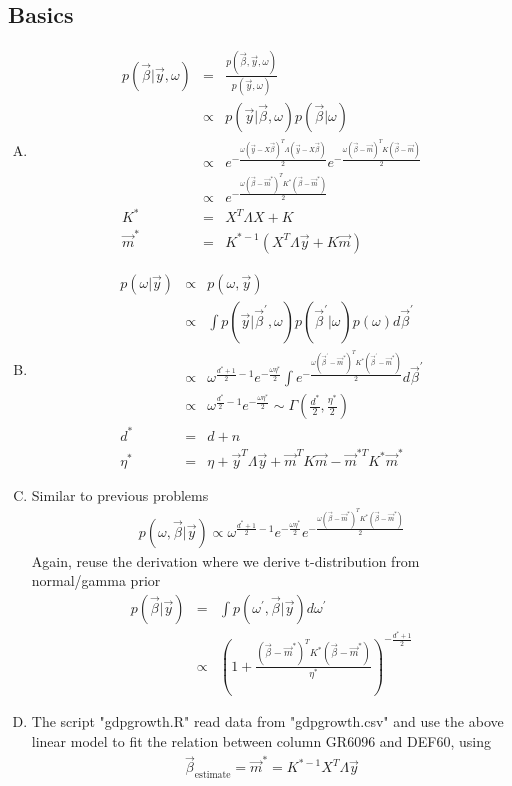 \documentclass{article}
\begin{document}
\subsection{Basics}
\begin{enumerate}[(A)]
\item
\begin{eqnarray}
p(\vec{\beta}|\vec{y},\omega)&=&\frac{p(\vec{\beta},\vec{y},\omega)}{p(\vec{y},\omega)}\nonumber\\
&\propto&p(\vec{y}|\vec{\beta},\omega)p(\vec{\beta}|\omega)\nonumber\\
&\propto&e^{-\frac{\omega(\vec{y}-X\vec{\beta})^T\Lambda(\vec{y}-X\vec{\beta})}{2}}e^{-\frac{\omega(\vec{\beta}-\vec{m})^TK(\vec{\beta}-\vec{m})}{2}}\nonumber\\
&\propto&e^{-\frac{\omega(\vec{\beta}-\vec{m}^*)^TK^*(\vec{\beta}-\vec{m}^*)}{2}}\\
K^*&=&X^T\Lambda X+K\\
\vec{m}^*&=&K^{*-1}(X^T\Lambda\vec{y}+K\vec{m})
\end{eqnarray}
\item
\begin{eqnarray}
p(\omega|\vec{y})&\propto&p(\omega,\vec{y})\nonumber\\
&\propto&\int p(\vec{y}|\vec{\beta}^\prime,\omega)p(\vec{\beta}^\prime|\omega)p(\omega)d\vec{\beta}^\prime\nonumber\\
&\propto&\omega^{\frac{d^*+1}{2}-1}e^{-\frac{\omega\eta^*}{2}}\int e^{-\frac{\omega(\vec{\beta}^\prime-\vec{m}^*)^TK^*(\vec{\beta}^\prime-\vec{m}^*)}{2}}d\vec{\beta}^\prime\nonumber\\
&\propto&\omega^{\frac{d^*}{2}-1}e^{-\frac{\omega\eta^*}{2}}\sim\Gamma(\frac{d^*}{2},\frac{\eta^*}{2})\\
d^*&=&d+n\\
\eta^*&=&\eta+\vec{y}^T\Lambda\vec{y}+\vec{m}^TK\vec{m}-\vec{m}^{*T}K^*\vec{m}^*
\end{eqnarray}
\item
Similar to previous problems
\begin{eqnarray}
p(\omega,\vec{\beta}|\vec{y})\propto\omega^{\frac{d^*+1}{2}-1}e^{-\frac{\omega\eta^*}{2}}e^{-\frac{\omega(\vec{\beta}-\vec{m}^*)^TK^*(\vec{\beta}-\vec{m}^*)}{2}}
\end{eqnarray}
Again, reuse the derivation where we derive t-distribution from normal/gamma prior
\begin{eqnarray}
p(\vec{\beta}|\vec{y})&=&\int p(\omega^\prime,\vec{\beta}|\vec{y})d\omega^\prime\nonumber\\
&\propto&(1+\frac{(\vec{\beta}-\vec{m}^*)^TK^*(\vec{\beta}-\vec{m}^*)}{\eta^*})^{-\frac{d^*+1}{2}}
\end{eqnarray}

\item
The script "gdpgrowth.R" read data from "gdpgrowth.csv" and use the above linear model to fit the relation between column GR6096 and DEF60, using
\begin{eqnarray}
\vec{\beta}_{\textrm{estimate}}=\vec{m}^*=K^{*-1}X^T\Lambda\vec{y}
\end{eqnarray} 
\end{enumerate}
\end{document}
